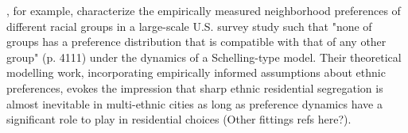 
\autocite{clark2008understanding}, for example, characterize the empirically measured neighborhood preferences of different racial groups in a large-scale U.S. survey study such that "none of groups has a preference distribution that is compatible with that of any other group" (p. 4111) under the dynamics of a Schelling-type model. Their theoretical modelling work, incorporating empirically informed assumptions about ethnic preferences, evokes the impression that sharp ethnic residential segregation is almost inevitable in multi-ethnic cities as long as preference dynamics have a significant role to play in residential choices (Other fittings refs here?).
